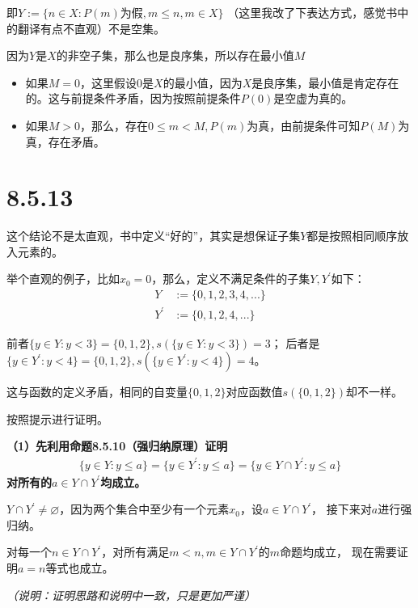 \documentclass{article}
\begin{document}
即$Y := \{n \in X: P(m) \text{为假},  m \leq n, m \in X  \}$
（这里我改了下表达方式，感觉书中的翻译有点不直观）不是空集。

因为$Y$是$X$的非空子集，那么也是良序集，所以存在最小值$M$

\begin{itemize}
  \item 如果$M = 0$，这里假设$0$是$X$的最小值，因为$X$是良序集，最小值是肯定存在的。这与前提条件矛盾，因为按照前提条件$P(0)$是空虚为真的。
  \item 如果$M > 0$，那么，存在$0 \leq m < M, P(m)$为真，由前提条件可知$P(M)$为真，存在矛盾。
\end{itemize}


\section*{8.5.13}

\begin{zremark}
  这个结论不是太直观，书中定义“好的”，其实是想保证子集$Y$都是按照相同顺序放入元素的。

  举个直观的例子，比如$x_0 = 0$，那么，定义不满足条件的子集$Y,Y^\prime$如下：
  \begin{align*}
    Y        & := \{0, 1, 2, 3, 4,...\} \\
    Y^\prime & := \{ 0, 1, 2, 4,... \}
  \end{align*}

  前者$\{y \in Y: y < 3\} = \{0, 1, 2\}, s(\{y \in Y: y < 3\}) = 3$；
  后者是$\{y \in Y^\prime: y < 4\} = \{0, 1, 2\}, s(\{y \in Y^\prime: y < 4\}) = 4$。

  这与函数的定义矛盾，相同的自变量$\{0, 1, 2\}$对应函数值$s(\{0, 1, 2\})$却不一样。
\end{zremark}

按照提示进行证明。

\textbf{（1）先利用命题8.5.10（强归纳原理）证明
  \begin{align*}
    \{y \in Y: y \leq a \} = \{y \in Y^\prime: y \leq a \} = \{y \in Y \cap Y^\prime: y \leq a \}
  \end{align*}
  对所有的$a \in Y \cap Y^\prime$均成立。}

$Y \cap Y^\prime \neq \varnothing$，因为两个集合中至少有一个元素$x_0$，设$a \in Y \cap Y^\prime$，
接下来对$a$进行强归纳。

对每一个$n \in Y \cap Y^\prime$，对所有满足$m < n, m \in Y \cap Y^\prime$的$m$命题均成立，
现在需要证明$a=n$等式也成立。

\textit{（说明：证明思路和说明中一致，只是更加严谨）}
\end{document}
